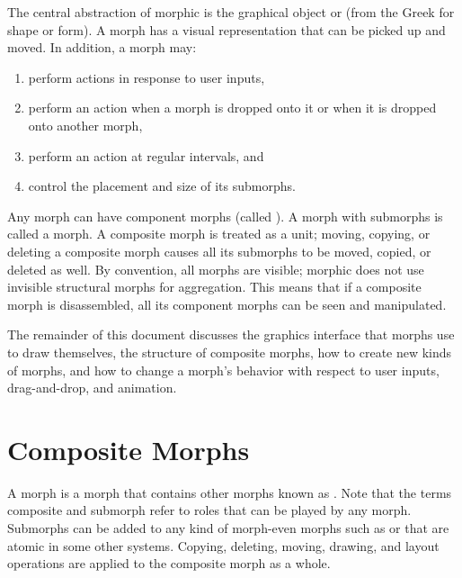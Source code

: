\documentclass[letterpaper,10pt,english]{sphinxmanual}
\begin{document}
The central abstraction of morphic is the graphical object or  (from the Greek for \sphinxquotedblleft{}shape\sphinxquotedblright{} or \sphinxquotedblleft{}form\sphinxquotedblright{}). A morph has a visual representation that can be picked up and moved. In addition, a morph may:
\begin{enumerate}
\item {} 
perform actions in response to user inputs,

\item {} 
perform an action when a morph is dropped onto it or when it is dropped onto another morph,

\item {} 
perform an action at regular intervals, and

\item {} 
control the placement and size of its submorphs.

\end{enumerate}

Any morph can have component morphs (called ). A morph with submorphs is called a  morph. A composite morph is treated as a unit; moving, copying, or deleting a composite morph causes all its submorphs to be moved, copied, or deleted as well. By convention, all morphs are visible; morphic does not use invisible structural morphs for aggregation. This means that if a composite morph is disassembled, all its component morphs can be seen and manipulated.

The remainder of this document discusses the graphics interface that morphs use to draw themselves, the structure of composite morphs, how to create new kinds of morphs, and how to change a morph's behavior with respect to user inputs, drag-and-drop, and animation.


\section{Composite Morphs}
\label{\detokenize{morphic:composite-morphs}}
A  morph is a morph that contains other morphs known as . Note that the terms \sphinxquotedblleft{}composite\sphinxquotedblright{} and \sphinxquotedblleft{}submorph\sphinxquotedblright{} refer to roles that can be played by any morph. Submorphs can be added to any kind of morph-even morphs such as  or  that are atomic in some other systems. Copying, deleting, moving, drawing, and layout operations are applied to the composite morph as a whole.
\end{document}
